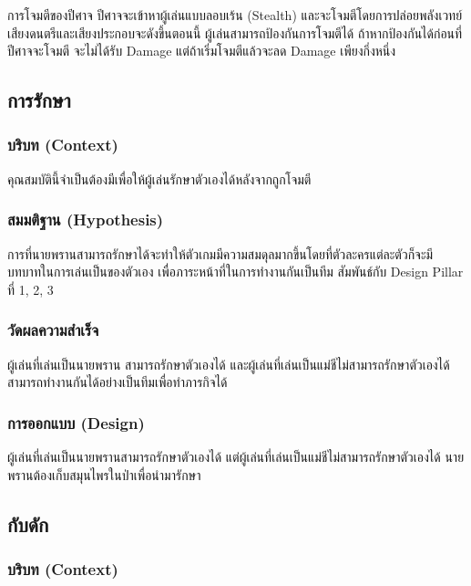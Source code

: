 การโจมตีของปีศาจ ปีศาจจะเข้าหาผู้เล่นแบบลอบเร้น (Stealth) และจะโจมตีโดยการปล่อยพลังเวทย์ เสียงดนตรีและเสียงประกอบจะดังขึ้นตอนนี้ ผู้เล่นสามารถป้องกันการโจมตีได้ ถ้าหากป้องกันได้ก่อนที่ปีศาจจะโจมตี จะไม่ได้รับ Damage แต่ถ้าเริ่มโจมตีแล้วจะลด Damage เพียงกึ่งหนึ่ง

\subsection{การรักษา}

\subsubsection{บริบท (Context)}

คุณสมบัตินี้จำเป็นต้องมีเพื่อให้ผู้เล่นรักษาตัวเองได้หลังจากถูกโจมตี

\subsubsection{สมมติฐาน (Hypothesis)}

การที่นายพรานสามารถรักษาได้จะทำให้ตัวเกมมีความสมดุลมากขึ้นโดยที่ตัวละครแต่ละตัวก็จะมีบทบาทในการเล่นเป็นของตัวเอง เพื่อภาระหน้าที่ในการทำงานกันเป็นทีม สัมพันธ์กับ Design Pillar ที่ 1, 2, 3

\subsubsection{วัดผลความสำเร็จ}

ผู้เล่นที่เล่นเป็นนายพราน สามารถรักษาตัวเองได้ และผู้เล่นที่เล่นเป็นแม่ชีไม่สามารถรักษาตัวเองได้ สามารถทำงานกันได้อย่างเป็นทีมเพื่อทำภารกิจได้

\subsubsection{การออกแบบ (Design)}

ผู้เล่นที่เล่นเป็นนายพรานสามารถรักษาตัวเองได้ แต่ผู้เล่นที่เล่นเป็นแม่ชีไม่สามารถรักษาตัวเองได้
นายพรานต้องเก็บสมุนไพรในป่าเพื่อนำมารักษา

\subsection{กับดัก}

\subsubsection{บริบท (Context)}

